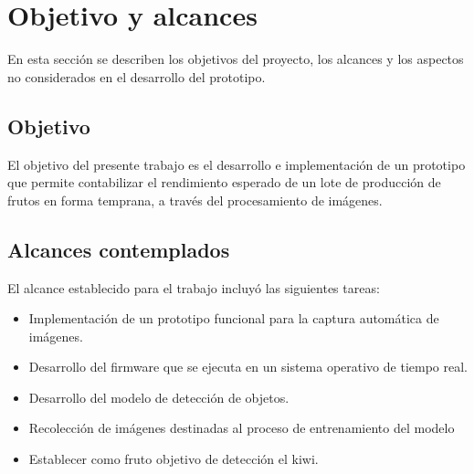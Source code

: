 

\section{Objetivo y alcances}

En esta sección se describen los objetivos del proyecto, los alcances y los aspectos no considerados en el desarrollo del prototipo.

\subsection{Objetivo}

El objetivo del presente trabajo es el desarrollo e implementación de un prototipo que permite contabilizar el rendimiento esperado de un lote de producción de frutos en forma temprana, a través del procesamiento de imágenes.

\subsection{Alcances contemplados}
El alcance establecido para el trabajo incluyó las siguientes tareas:

\begin{itemize}
\item Implementación de un prototipo funcional para la captura automática de imágenes.
\item Desarrollo del firmware que se ejecuta en un sistema operativo de tiempo real.
\item Desarrollo del modelo de detección de objetos.
\item Recolección de imágenes destinadas al proceso de entrenamiento del modelo
\item Establecer como fruto objetivo  de detección el kiwi.
\end{itemize}

